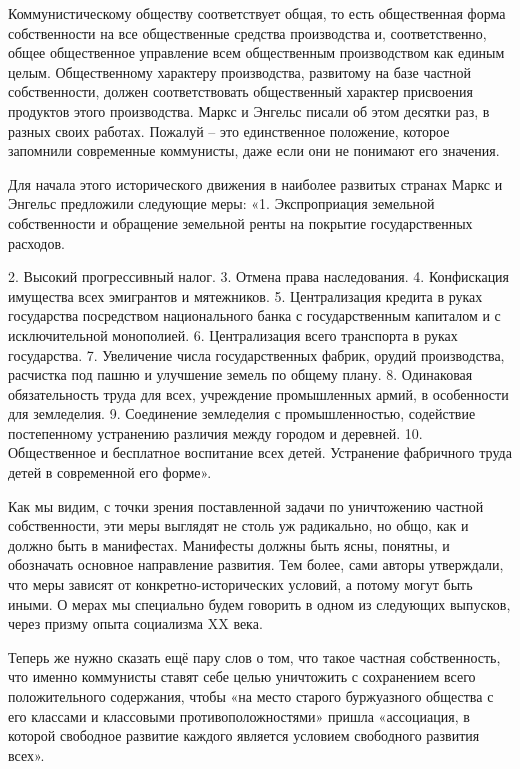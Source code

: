 \documentclass[12pt,a4paper,openany]{book}
\begin{document}
Коммунистическому обществу соответствует общая, то есть общественная форма собственности на все общественные средства производства и, соответственно, общее общественное управление всем общественным производством как единым целым. Общественному характеру производства, развитому на базе частной собственности, должен соответствовать общественный характер присвоения продуктов этого производства. Маркс и Энгельс писали об этом десятки раз, в разных своих работах. Пожалуй – это единственное положение, которое запомнили современные коммунисты, даже если они не понимают его значения.

Для начала этого исторического движения в наиболее развитых странах Маркс и Энгельс предложили следующие меры: «1. Экспроприация земельной собственности и обращение земельной ренты на покрытие государственных расходов.

2. Высокий прогрессивный налог. 3. Отмена права наследования. 4. Конфискация имущества всех эмигрантов и мятежников. 5. Централизация кредита в руках государства посредством национального банка с государственным капиталом и с исключительной монополией. 6. Централизация всего транспорта в руках государства. 7. Увеличение числа государственных фабрик, орудий производства, расчистка под пашню и улучшение земель по общему плану. 8. Одинаковая обязательность труда для всех, учреждение промышленных армий, в особенности для земледелия. 9. Соединение земледелия с промышленностью, содействие постепенному устранению различия между городом и деревней. 10. Общественное и бесплатное воспитание всех детей. Устранение фабричного труда детей в современной его форме».

Как мы видим, с точки зрения поставленной задачи по уничтожению частной собственности, эти меры выглядят не столь уж радикально, но общо, как и должно быть в манифестах. Манифесты должны быть ясны, понятны, и обозначать основное направление развития. Тем более, сами авторы утверждали, что меры зависят от конкретно-исторических условий, а потому могут быть иными. О мерах мы специально будем говорить в одном из следующих выпусков, через призму опыта социализма XX века.

Теперь же нужно сказать ещё пару слов о том, что такое частная собственность, что именно коммунисты ставят себе целью уничтожить с сохранением всего положительного содержания, чтобы «на место старого буржуазного общества с его классами и классовыми противоположностями» пришла «ассоциация, в которой свободное развитие каждого является условием свободного развития всех».
\end{document}
